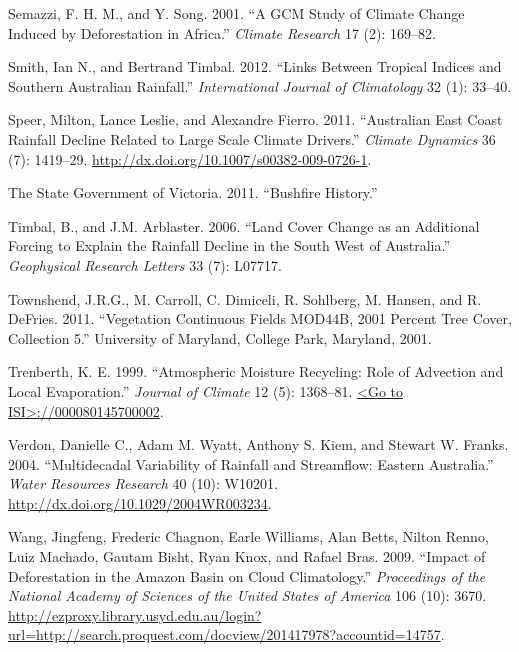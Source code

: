 \documentclass[]{elsarticle} %
\theoremstyle{definition}
\theoremstyle{definition}
\theoremstyle{definition}
\theoremstyle{remark}
\begin{document}
\hypertarget{ref-Semazzi2001}{}
Semazzi, F. H. M., and Y. Song. 2001. ``A GCM Study of Climate Change
Induced by Deforestation in Africa.'' \emph{Climate Research} 17 (2):
169--82.

\hypertarget{ref-Smith2012}{}
Smith, Ian N., and Bertrand Timbal. 2012. ``Links Between Tropical
Indices and Southern Australian Rainfall.'' \emph{International Journal
of Climatology} 32 (1): 33--40.

\hypertarget{ref-Speer2011}{}
Speer, Milton, Lance Leslie, and Alexandre Fierro. 2011. ``Australian
East Coast Rainfall Decline Related to Large Scale Climate Drivers.''
\emph{Climate Dynamics} 36 (7): 1419--29.
\url{http://dx.doi.org/10.1007/s00382-009-0726-1}.

\hypertarget{ref-Fire2011}{}
The State Government of Victoria. 2011. ``Bushfire History.''

\hypertarget{ref-Timbal2006}{}
Timbal, B., and J.M. Arblaster. 2006. ``Land Cover Change as an
Additional Forcing to Explain the Rainfall Decline in the South West of
Australia.'' \emph{Geophysical Research Letters} 33 (7): L07717.

\hypertarget{ref-Townshend2011}{}
Townshend, J.R.G., M. Carroll, C. Dimiceli, R. Sohlberg, M. Hansen, and
R. DeFries. 2011. ``Vegetation Continuous Fields MOD44B, 2001 Percent
Tree Cover, Collection 5.'' University of Maryland, College Park,
Maryland, 2001.

\hypertarget{ref-Trenberth1999}{}
Trenberth, K. E. 1999. ``Atmospheric Moisture Recycling: Role of
Advection and Local Evaporation.'' \emph{Journal of Climate} 12 (5):
1368--81.
\href{\%3CGo\%20to\%20ISI\%3E://000080145700002}{\textless{}Go to ISI\textgreater{}://000080145700002}.

\hypertarget{ref-Verdon2004}{}
Verdon, Danielle C., Adam M. Wyatt, Anthony S. Kiem, and Stewart W.
Franks. 2004. ``Multidecadal Variability of Rainfall and Streamflow:
Eastern Australia.'' \emph{Water Resources Research} 40 (10): W10201.
\url{http://dx.doi.org/10.1029/2004WR003234}.

\hypertarget{ref-Wang2009}{}
Wang, Jingfeng, Frederic Chagnon, Earle Williams, Alan Betts, Nilton
Renno, Luiz Machado, Gautam Bisht, Ryan Knox, and Rafael Bras. 2009.
``Impact of Deforestation in the Amazon Basin on Cloud Climatology.''
\emph{Proceedings of the National Academy of Sciences of the United
States of America} 106 (10): 3670.
\url{http://ezproxy.library.usyd.edu.au/login?url=http://search.proquest.com/docview/201417978?accountid=14757}.
\end{document}

